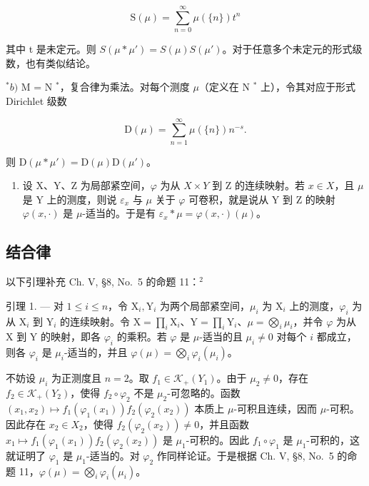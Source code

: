 \[
\mathrm{S} (\mu) = \sum_ {n = 0} ^ {\infty} \mu (\{n \}) t ^ {n}
\]

其中 t 是未定元。则 \(S(\mu * \mu') = S(\mu)S(\mu')\)。对于任意多个未定元的形式级数，也有类似结论。

\(^{*}b)\) M = N \(^{*}\)，复合律为乘法。对每个测度 \(\mu\)（定义在 N \(^{*}\) 上），令其对应于形式 Dirichlet 级数

\[
\mathrm{D} (\mu) = \sum_ {n = 1} ^ {\infty} \mu (\{n \}) n ^ {- s}.
\]

则 \(\mathrm{D}(\mu * \mu') = \mathrm{D}(\mu) \mathrm{D}(\mu')\)。

\begin{enumerate}
\def\labelenumi{\arabic{enumi})}
\setcounter{enumi}{2}
\tightlist
\item
  设 X、Y、Z 为局部紧空间，\(\varphi\) 为从 \(X \times Y\) 到 Z 的连续映射。若 \(x \in X\)，且 \(\mu\) 是 Y 上的测度，则说 \(\varepsilon_{x}\) 与 \(\mu\) 关于 \(\varphi\) 可卷积，就是说从 Y 到 Z 的映射 \(\varphi(x,\cdot)\) 是 \(\mu\)-适当的。于是有 \(\varepsilon_{x} * \mu = \varphi(x,\cdot)(\mu)\)。
\end{enumerate}

\subsection{结合律}

以下引理补充 Ch. V, §8, No.~5 的命题 11：\(^{2}\)

引理 1. --- 对 \(1 \leqslant i \leqslant n\)，令 \(\mathrm{X}_i, \mathrm{Y}_i\) 为两个局部紧空间，\(\mu_i\) 为 \(\mathrm{X}_i\) 上的测度，\(\varphi_i\) 为从 \(\mathrm{X}_i\) 到 \(\mathrm{Y}_i\) 的连续映射。令 \(\mathrm{X} = \prod_i \mathrm{X}_i\)、\(\mathrm{Y} = \prod_i \mathrm{Y}_i\)、\(\mu = \bigotimes_i \mu_i\)，并令 \(\varphi\) 为从 \(\mathrm{X}\) 到 \(\mathrm{Y}\) 的映射，即各 \(\varphi_i\) 的乘积。若 \(\varphi\) 是 \(\mu\)-适当的且 \(\mu_i \neq 0\) 对每个 \(i\) 都成立，则各 \(\varphi_i\) 是 \(\mu_i\)-适当的，并且 \(\varphi(\mu) = \bigotimes_i \varphi_i(\mu_i)\)。

不妨设 \(\mu_{i}\) 为正测度且 \(n = 2\)。取 \(f_{1} \in \mathcal{K}_{+}(Y_{1})\)。由于 \(\mu_{2} \neq 0\)，存在 \(f_{2} \in \mathcal{K}_{+}(Y_{2})\)，使得 \(f_{2} \circ \varphi_{2}\) 不是 \(\mu_{2}\)-可忽略的。函数 \((x_{1}, x_{2}) \mapsto f_{1}(\varphi_{1}(x_{1})) f_{2}(\varphi_{2}(x_{2}))\) 本质上 \(\mu\)-可积且连续，因而 \(\mu\)-可积。因此存在 \(x_{2} \in X_{2}\)，使得 \(f_{2}(\varphi_{2}(x_{2})) \neq 0\)，并且函数 \(x_{1} \mapsto f_{1}(\varphi_{1}(x_{1})) f_{2}(\varphi_{2}(x_{2}))\) 是 \(\mu_{1}\)-可积的。因此 \(f_{1} \circ \varphi_{1}\) 是 \(\mu_{1}\)-可积的，这就证明了 \(\varphi_{1}\) 是 \(\mu_{1}\)-适当的。对 \(\varphi_{2}\) 作同样论证。于是根据 Ch. V, §8, No.~5 的命题 11，\(\varphi(\mu) = \bigotimes_{i} \varphi_{i}(\mu_{i})\)。

